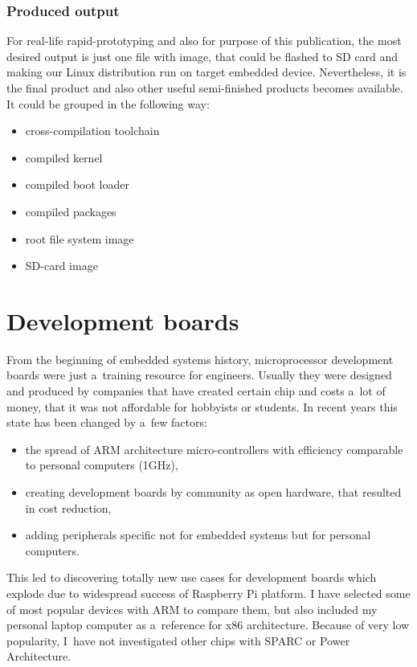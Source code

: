 \documentclass[printmode]{mgr}
\begin{document}
\subsection*{Produced output}

For real-life rapid-prototyping and also for purpose of this publication, the most desired output is just one file with image, that could be flashed to SD card and making our Linux distribution run on target embedded device. Nevertheless, it is the final product and also other useful semi-finished products becomes available. It could be grouped in the following way:

\begin{itemize}
    \item cross-compilation toolchain
    \item compiled kernel
    \item compiled boot loader
    \item compiled packages
    \item root file system image
    \item SD-card image
\end{itemize}



















\chapter{Development boards}
\label{section:development-boards}

From the beginning of embedded systems history, microprocessor development boards were just a~training resource for engineers.
Usually they were designed and produced by companies that have created certain chip and costs a~lot of money, that it was not affordable for hobbyists or students.
In recent years this state has been changed by a~few factors:
\begin{itemize}
  \item the spread of ARM architecture micro-controllers with efficiency comparable to personal computers (1GHz),
  \item creating development boards by community as open hardware, that resulted in cost reduction,
  \item adding peripherals specific not for embedded systems but for personal computers.
\end{itemize}
This led to discovering totally new use cases for development boards which explode due to widespread success of Raspberry Pi platform.
I have selected some of most popular devices with ARM to compare them, but also included my personal laptop computer as a~reference for x86 architecture. Because of very low popularity, I~have not investigated other chips with SPARC or Power Architecture.
\end{document}
